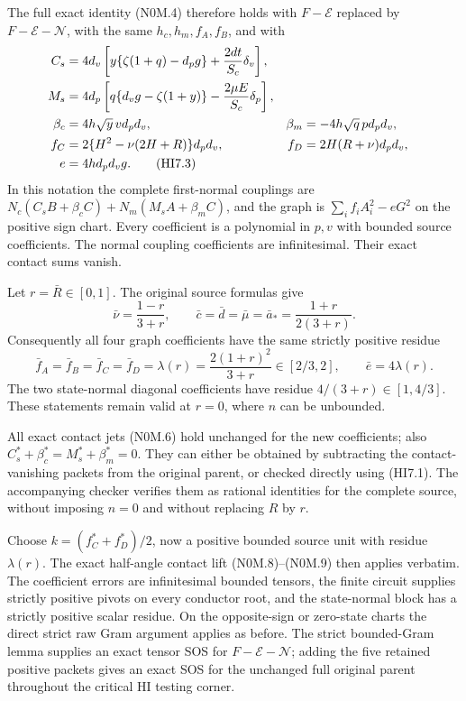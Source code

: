 The full exact identity (N0M.4) therefore holds with
$F-\mathcal E$ replaced by $F-\mathcal E-\mathcal N$, with the same
$h_c,h_m,f_A,f_B$, and with
\begin{align}
 C_s&=4d_v\left[y\{\zeta(1+q)-d_pg\}
                       +\frac{2dt}{S_c}\delta_v\right],\notag\\
 M_s&=4d_p\left[q\{d_vg-\zeta(1+y)\}
                       -\frac{2\mu E}{S_c}\delta_p\right],\notag\\
 \beta_c&=4h\sqrt y\,v d_pd_v,
 &\beta_m&=-4h\sqrt q\,p d_pd_v,\notag\\
 f_C&=2\{H^2-\nu(2H+R)\}d_pd_v,
 &f_D&=2H(R+\nu)d_pd_v,\notag\\
 e&=4h d_pd_vg.                                  \tag{HI7.3}
\end{align}
In this notation the complete first-normal couplings are
$N_c(C_sB+\beta_cC)+N_m(M_sA+\beta_mC)$, and the graph is
$\sum_i f_iA_i^2-eG^2$ on the positive sign chart. Every coefficient
is a polynomial in $p,v$ with bounded source coefficients. The normal
coupling coefficients are infinitesimal. Their exact contact sums vanish.

Let $r=\bar R\in[0,1]$. The original source formulas give
\[
 \bar\nu=\frac{1-r}{3+r},\qquad
 \bar c=\bar d=\bar\mu=\bar a_*
        =\frac{1+r}{2(3+r)}.
\]
Consequently all four graph coefficients have the same strictly positive
residue
\[
 \bar f_A=\bar f_B=\bar f_C=\bar f_D
       =\lambda(r)=\frac{2(1+r)^2}{3+r}\in[2/3,2],
 \qquad \bar e=4\lambda(r).                       \tag{HI7.4}
\]
The two state-normal diagonal coefficients have residue
$4/(3+r)\in[1,4/3]$.
These statements remain valid at $r=0$, where $n$ can be unbounded.

All exact contact jets (N0M.6) hold unchanged for the new coefficients;
also $C_s^*+\beta_c^*=M_s^*+\beta_m^*=0$. They can either be obtained
by subtracting the contact-vanishing packets from the original parent,
or checked directly using (HI7.1). The accompanying checker verifies
them as rational identities for the complete source, without imposing
$n=0$ and without replacing $R$ by $r$.

Choose $k=(f_C^*+f_D^*)/2$, now a positive bounded source unit with
residue $\lambda(r)$. The exact half-angle contact lift (N0M.8)--(N0M.9)
then applies verbatim. The coefficient errors are infinitesimal bounded
tensors, the finite circuit supplies strictly positive pivots on every
conductor root, and the state-normal block has a strictly positive
scalar residue. On
the opposite-sign or zero-state charts the direct strict raw Gram
argument applies as before. The strict bounded-Gram lemma supplies an
exact tensor SOS for $F-\mathcal E-\mathcal N$; adding the five retained
positive packets gives an exact SOS for the unchanged full original
parent throughout the critical HI testing corner.

